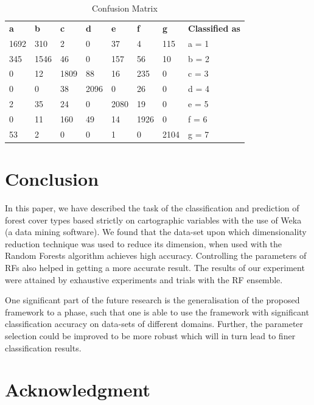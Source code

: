 \documentclass{llncs}
\begin{document}
\begin{table}
    \label{matrix}
    \caption{Confusion Matrix}
    \renewcommand{\arraystretch}{1.2}
    \centering
        \begin{tabular}{l l l l l l l | l}
        \textbf{a} & \textbf{b} & \textbf{c} & \textbf{d} & \textbf{e} & \textbf{f} & \textbf{g} & \textbf{Classified as}  \\
        1692 & 310 & 2 & 0 & 37 & 4 & 115 &  a = 1 \\
        345 & 1546 & 46 & 0 & 157 & 56 & 10 &  b = 2 \\
        0 & 12 & 1809 & 88 & 16 & 235 & 0 &  c = 3 \\
        0 & 0 & 38 & 2096 & 0 & 26 & 0 &  d = 4 \\
        2 & 35 & 24 & 0 & 2080 & 19 & 0 &  e = 5 \\
        0 & 11 & 160 & 49 & 14 & 1926 & 0 &  f = 6 \\
        53 & 2 & 0 & 0 & 1 & 0 & 2104 &  g = 7 \\
        \end{tabular}
\end{table}


\section{Conclusion}

In this paper, we have described the task of the classification and prediction of forest cover types based strictly on cartographic variables with the use of Weka (a data mining software). We found that the data-set upon which dimensionality reduction technique was used to reduce its dimension, when used with the Random Forests algorithm achieves high accuracy. Controlling the parameters of RFs also helped in getting a more accurate result. The results of our experiment were attained by exhaustive experiments and trials with the RF ensemble.

One significant part of the future research is the generalisation of the proposed framework to a phase, such that one is able to use the framework with significant classification accuracy on data-sets of different domains. Further, the parameter selection could be improved to be more robust which will in turn lead to finer classification results.


 \section*{Acknowledgment}
\end{document}
